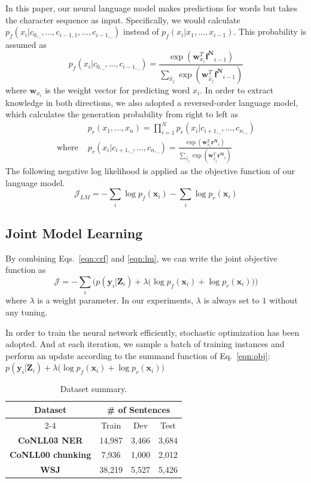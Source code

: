 \documentclass[letterpaper]{article} %
\newcommand{\saft}{}
\def \myspace {\_}
\def \w {\mathbf{w}}
\def \x {\mathbf{x}}
\def \y {\mathbf{y}}
\def \Z {\mathbf{Z}}
\def \fw {\mathbf{f^{N}}}
\def \rw {\mathbf{r^{N}}}
\begin{document}
In this paper, our neural language model makes predictions for words but takes the character sequence as input. Specifically, we would calculate $p_f(x_i| c_{0, \myspace}, \dots, c_{i-1, 1}, \dots, c_{i-1, \myspace})$ instead of $p_f(x_i | x_1, \dots, x_{i-1})$. This probability is assumed as
$$
p_f(x_i| c_{0, \myspace}, \dots, c_{i-1, \myspace}) = \frac{\exp(\w_{x_i}^T \fw_{i-1})}{\sum_{\hat{x}_j} \exp(\w_{\hat{x}_j}^T \fw_{i-1})}
$$
where $\w_{x_i}$ is the weight vector for predicting word $x_i$.
In order to extract knowledge in both directions, we also adopted a reversed-order language model, 
which calculates the generation probability from right to left as
\begin{align*}
&p_r(x_1, ..., x_n) = \prod_{i=1}^N p_r(x_i| c_{i+1, \myspace}, \dots, c_{n, \myspace}) \\
\mbox{where }& p_r(x_i| c_{i+1, \myspace}, \dots, c_{n, \myspace}) = \frac{\exp(\w_{x_i}^T \rw_{i})}{\sum_{\hat{x}_j} \exp(\w_{\hat{x}_j}^T \rw_{i})}
\end{align*}
The following negative log likelihood is applied as the objective function of our language model.
\begin{equation}
\mathcal{J}_{LM} = -\sum_{i} \log p_f(\x_i) -\sum_{i} \log p_r(\x_i)
\label{eqn:lm}
\end{equation}

\subsection{Joint Model Learning}

By combining Eqs.~\ref{eqn:crf} and \ref{eqn:lm}, we can write the joint objective function as
\begin{equation}
\mathcal{J} = -\sum_{i} \Big( p(\y_i | \Z_i) + \lambda \big( \log p_f(\x_i) + \log p_r(\x_i) \big) \Big)
\label{eqn:obj}
\end{equation}
where $\lambda$ is a weight parameter. In our experiments, $\lambda$ is always set to $1$ without any tuning.

In order to train the neural network efficiently, stochastic optimization has been adopted. And at each iteration, we sample a batch of training instances and perform an update according to the summand function of Eq.~\ref{eqn:obj}: $
p(\y_i | \Z_i) + \lambda \big( \log p_f(\x_i) + \log p_r(\x_i) \big)
$ 


\begin{table}[t]
\center
\begin{tabular}{c||c|c|c}
\hline
\multirow{2}{*}{Dataset}& \multicolumn{3}{|c}{\# of Sentences} \\
\cline{2-4}
&  Train & Dev & Test\\
\hline
\hline
\textbf{CoNLL03 NER} & 14,987 & 3,466 & 3,684 \\
\hline
\textbf{CoNLL00 chunking} & 7,936 & 1,000 & 2,012 \\
\hline
\textbf{WSJ} & 38,219 & 5,527 & 5,426 \\
\hline
\end{tabular}
\caption{Dataset summary.}\label{tbl:dataset}
\saft
\end{table}
\end{document}
